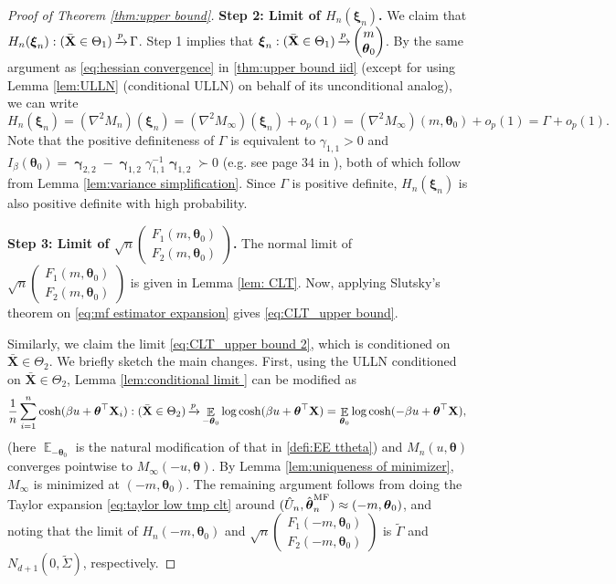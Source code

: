\documentclass[preprint,reqno]{imsart}
\newcommand{\ttheta}{\boldsymbol{\theta}}
\DeclareMathOperator{\xp}{\xrightarrow{\mathnormal p}}
\DeclareMathOperator{\ggamma}{\boldsymbol{\gamma}}
\DeclareMathOperator{\EE}{\mathbb{E}}
\newcommand{\X}{\mathbf{X}}
\newcommand{\xxi}{\boldsymbol \xi}
\DeclareMathOperator{\sumin}{\sum_{\mathnormal i=1}^{\mathnormal n}}
\newcommand{\thetamf}{\hat{\boldsymbol \theta}^{\text{MF}}_{\mathnormal n}}
\begin{document}
\begin{appendix}
\begin{proof}[Proof of Theorem \ref{thm:upper bound}]
    \vspace{2mm}
    \textbf{Step 2: Limit of $H_n(\xxi_n)$.} We claim that $H_n(\xxi_n) : (\bar{\X}\in \Theta_1) \xp \Gamma$. Step 1 implies that $\xxi_n : (\bar{\X} \in \Theta_1) \xp \begin{pmatrix}
        m \\ \ttheta_0
    \end{pmatrix}$.
    By the same argument as \eqref{eq:hessian convergence} in \cref{thm:upper bound iid} (except for using Lemma \ref{lem:ULLN} (conditional ULLN) on behalf of its unconditional analog), we can write
    $$H_n(\xxi_n) = (\nabla^2 M_n) (\xxi_n) = (\nabla^2 M_\infty) (\xxi_n) + o_p(1) = (\nabla^2 M_\infty)(m,\ttheta_0) + o_p(1) = \Gamma + o_p(1).$$
    Note that the positive definiteness of $\Gamma$ is equivalent to $\gamma_{1,1} > 0$ and $I_\beta(\ttheta_0) = \ggamma_{2,2} - \ggamma_{1,2} \gamma_{1,1}^{-1} \ggamma_{1,2} \succ 0$ (e.g. see page 34 in \cite{zhang2006schur}), both of which follow from Lemma \ref{lem:variance simplification}.
    Since $\Gamma$ is positive definite, $H_n(\xxi_n)$ is also positive definite with high probability.

    \textbf{Step 3: Limit of $\sqrt{n} \begin{pmatrix} F_1(m, \ttheta_0) \\ F_2(m, \ttheta_0) \end{pmatrix}$.} The normal limit of $\sqrt{n} \begin{pmatrix} F_1(m, \ttheta_0) \\ F_2(m, \ttheta_0) \end{pmatrix}$ is given in Lemma \ref{lem: CLT}. Now, applying  Slutsky's theorem on \eqref{eq:mf estimator expansion} gives \eqref{eq:CLT_upper bound}.
    
    \vspace{2mm}
    Similarly, we claim the limit \eqref{eq:CLT_upper bound 2}, which is conditioned on $\bar{\X} \in \Theta_2$. We briefly sketch the main changes. First, using the ULLN conditioned on $\bar{\X} \in \Theta_2$, Lemma \ref{lem:conditional limit } can be modified as 
    $$\frac{1}{n} \sumin \cosh(\beta u + \ttheta^\top \X_i) : (\bar{\X} \in \Theta_2) \xp \EE_{-\ttheta_0} \log \cosh(\beta u + \ttheta^\top \X) = \EE_{\ttheta_0} \log \cosh(-\beta u + \ttheta^\top \X), $$
    (here $\EE_{-\ttheta_0}$ is the natural modification of that in \cref{defi:EE ttheta})
    and $M_n(u, \ttheta)$ converges pointwise to $M_{\infty} (-u, \ttheta)$.
    By Lemma \ref{lem:uniqueness of minimizer}, ${M}_{\infty}$ 
    is minimized at $(-m, \ttheta_0)$. The remaining argument follows from doing the Taylor expansion \eqref{eq:taylor low tmp clt} around $(\hat{U}_n, \thetamf) \approx (-m, \ttheta_0)$, and noting that the limit of $H_n(-m, \ttheta_0)$ and $\sqrt{n}\begin{pmatrix}
        F_1(-m, \ttheta_0) \\ F_2(-m, \ttheta_0)
    \end{pmatrix}$
    is $\tilde{\Gamma}$ and $N_{d+1}(0, \tilde{\Sigma})$, respectively.
    

\end{proof}
\end{appendix}
\end{document}

